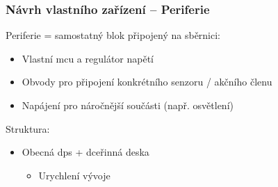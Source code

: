 \documentclass[%
  12pt,       				%
	t,                  %
	aspectratio=1610,   %
	unicode,						%
]{beamer}				    	%
\begin{document}
\begin{frame}[fragile]
\end{frame}


\begin{frame}[fragile]
	\frametitle{Návrh vlastního zařízení -- Periferie}
		Periferie = samostatný blok připojený na sběrnici:\\[1ex]
		\begin{itemize}
			\item Vlastní \acs{mcu} a regulátor napětí
			\item Obvody pro připojení konkrétního senzoru / akčního členu 
			\item Napájení pro náročnější součásti (např. osvětlení)
		\end{itemize}
		\vspace{1.5ex}%
		Struktura:\\[1ex]
		\begin{itemize}
			\item Obecná \acs{dps} + dceřinná deska
			\begin{itemize}
				\item Urychlení vývoje
			\end{itemize}
		\end{itemize}

\end{frame}
\end{document}
